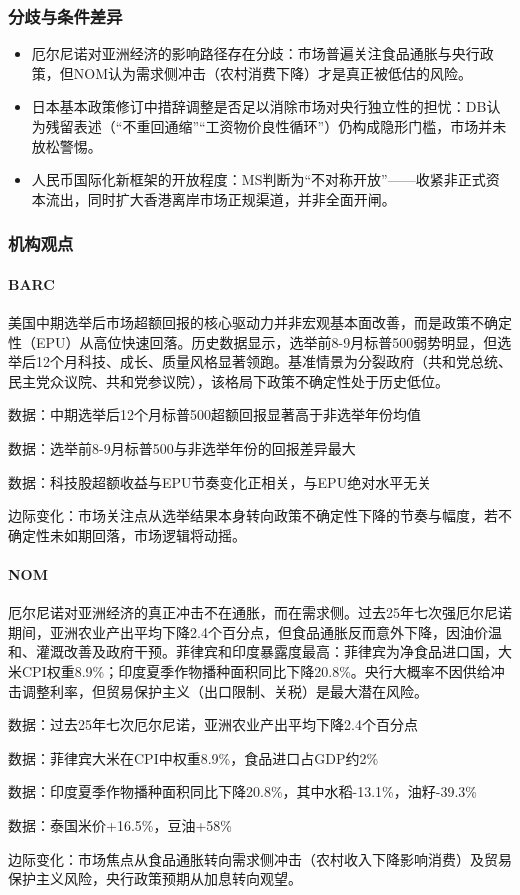 \documentclass[11pt]{ctexart}
\begin{document}
\subsubsection*{分歧与条件差异}
\begin{itemize}
  \item 厄尔尼诺对亚洲经济的影响路径存在分歧：市场普遍关注食品通胀与央行政策，但NOM认为需求侧冲击（农村消费下降）才是真正被低估的风险。
  \item 日本基本政策修订中措辞调整是否足以消除市场对央行独立性的担忧：DB认为残留表述（“不重回通缩”“工资物价良性循环”）仍构成隐形门槛，市场并未放松警惕。
  \item 人民币国际化新框架的开放程度：MS判断为“不对称开放”——收紧非正式资本流出，同时扩大香港离岸市场正规渠道，并非全面开闸。
\end{itemize}
\subsubsection*{机构观点}
\paragraph{BARC} 美国中期选举后市场超额回报的核心驱动力并非宏观基本面改善，而是政策不确定性（EPU）从高位快速回落。历史数据显示，选举前8-9月标普500弱势明显，但选举后12个月科技、成长、质量风格显著领跑。基准情景为分裂政府（共和党总统、民主党众议院、共和党参议院），该格局下政策不确定性处于历史低位。
{\small\color{refgray}数据：中期选举后12个月标普500超额回报显著高于非选举年份均值\par}
{\small\color{refgray}数据：选举前8-9月标普500与非选举年份的回报差异最大\par}
{\small\color{refgray}数据：科技股超额收益与EPU节奏变化正相关，与EPU绝对水平无关\par}
{\small\color{refgray}边际变化：市场关注点从选举结果本身转向政策不确定性下降的节奏与幅度，若不确定性未如期回落，市场逻辑将动摇。\par}
\paragraph{NOM} 厄尔尼诺对亚洲经济的真正冲击不在通胀，而在需求侧。过去25年七次强厄尔尼诺期间，亚洲农业产出平均下降2.4个百分点，但食品通胀反而意外下降，因油价温和、灌溉改善及政府干预。菲律宾和印度暴露度最高：菲律宾为净食品进口国，大米CPI权重8.9\%；印度夏季作物播种面积同比下降20.8\%。央行大概率不因供给冲击调整利率，但贸易保护主义（出口限制、关税）是最大潜在风险。
{\small\color{refgray}数据：过去25年七次厄尔尼诺，亚洲农业产出平均下降2.4个百分点\par}
{\small\color{refgray}数据：菲律宾大米在CPI中权重8.9\%，食品进口占GDP约2\%\par}
{\small\color{refgray}数据：印度夏季作物播种面积同比下降20.8\%，其中水稻-13.1\%，油籽-39.3\%\par}
{\small\color{refgray}数据：泰国米价+16.5\%，豆油+58\%\par}
{\small\color{refgray}边际变化：市场焦点从食品通胀转向需求侧冲击（农村收入下降影响消费）及贸易保护主义风险，央行政策预期从加息转向观望。\par}
\end{document}
